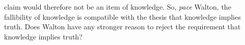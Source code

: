 \documentclass[12pt,a4paper]{article}
\begin{document}
claim would therefore not be an item of knowledge. 
So, \textit{pace} %
Walton, the fallibility of knowledge is compatible with 
the thesis that knowledge implies truth. Does Walton have any stronger reason 
to reject the requirement that knowledge implies truth?










\end{document}
